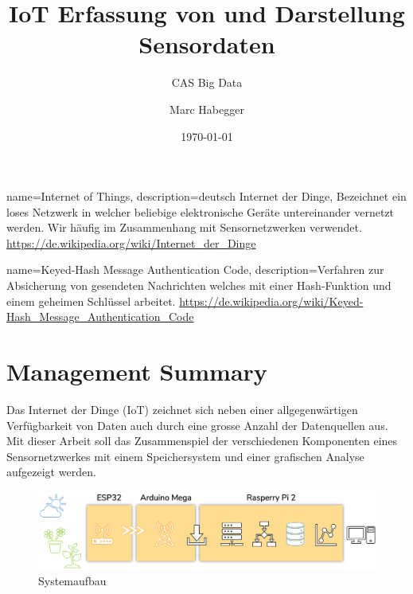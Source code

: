\documentclass[
  12pt, %
  a4paper, %
  twoside, %
  openright, %
  numbers=noenddot, %
  BCOR=5mm, %
  parskip=half*, %
  thesis, %
]{bfhbook}
\author{Marc Habegger}
\title{IoT Erfassung von und Darstellung Sensordaten}
\subtitle{CAS Big Data}
\date{\today} %
\begin{document}
 
{
    name=Internet of Things,
    description={deutsch Internet der Dinge, Bezeichnet ein loses Netzwerk in welcher beliebige elektronische Geräte untereinander vernetzt werden. Wir häufig im Zusammenhang mit Sensornetzwerken verwendet.\break 
    \url{https://de.wikipedia.org/wiki/Internet_der_Dinge}}
}

{
    name=Keyed-Hash Message Authentication Code,
    description={Verfahren zur Absicherung von gesendeten Nachrichten welches mit einer Hash-Funktion und einem geheimen Schlüssel arbeitet.\break
    \url{https://de.wikipedia.org/wiki/Keyed-Hash_Message_Authentication_Code}}
}

\maketitle
\frontmatter %

\tableofcontents
\sloppy
\mainmatter %
\chapter*{Management Summary}

Das Internet der Dinge (\Gls{IoT}) zeichnet sich neben einer allgegenwärtigen Verfügbarkeit von Daten auch durch eine grosse Anzahl der Datenquellen aus. Mit dieser Arbeit soll das Zusammenspiel der verschiedenen Komponenten eines Sensornetzwerkes mit einem Speichersystem und einer grafischen Analyse aufgezeigt werden.

\begin{figure}[htp]
  \begin{center}
    \includegraphics[width=18cm, left]{Bilder/Overview.png}
  \end{center}
    \caption{Systemaufbau}
\end{figure}
\end{document}
